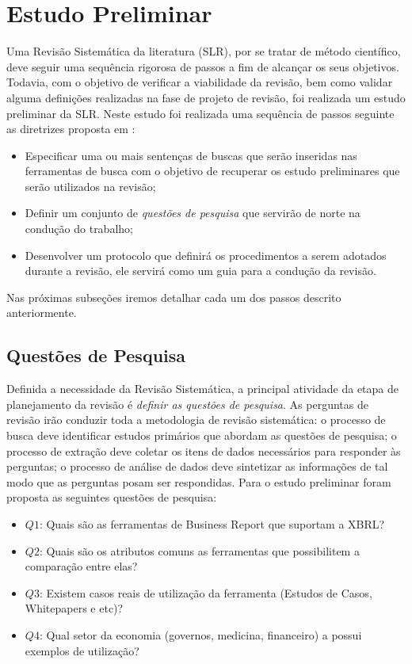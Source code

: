 \documentclass{article}
\begin{document}
\section{Estudo Preliminar}
\label{sec:rsl}

Uma Revisão Sistemática da literatura (SLR), por se tratar de método
científico, deve seguir uma sequência rigorosa de passos a fim de
alcançar os seus objetivos. Todavia, com o objetivo de verificar a
viabilidade da revisão, bem como validar alguma definições realizadas
na fase de projeto de revisão, foi realizada um estudo preliminar da
SLR. Neste estudo foi realizada uma sequência de passos seguinte as
diretrizes proposta em \cite{keele2007guidelines}: 
\begin{itemize}
  \item Especificar uma ou mais sentenças de buscas que serão
    inseridas nas ferramentas de busca com o objetivo de recuperar os
    estudo preliminares que serão utilizados na revisão;
  \item Definir um conjunto de \textit{questões de pesquisa} que
    servirão de norte na condução do trabalho;
 \item Desenvolver um protocolo que definirá os procedimentos a serem adotados durante a revisão, ele servirá como um guia para a condução da revisão. 
\end{itemize}

Nas próximas subseções iremos detalhar cada um dos passos descrito
anteriormente.
\subsection{Questões de Pesquisa}
\label{subsec:research_question}

Definida a necessidade da Revisão Sistemática, a principal atividade
da etapa de planejamento da revisão é \textit{definir as questões de
  pesquisa}. As perguntas de revisão irão conduzir toda a metodologia
de revisão sistemática: o processo de busca deve identificar estudos
primários que abordam as questões de pesquisa; o processo de extração
deve coletar os itens de dados necessários para responder às
perguntas; o processo de análise de dados deve sintetizar as
informações de tal modo que as perguntas posam ser respondidas. Para o
estudo preliminar foram proposta as seguintes questões de pesquisa:
\begin{itemize}
  \item \textbf{$Q1$}: Quais são as ferramentas de Business Report que
    suportam a XBRL?
  \item \textbf{$Q2$}: Quais são os atributos comuns as ferramentas
    que possibilitem a comparação entre elas?
  \item \textbf{$Q3$}: Existem casos reais de utilização da ferramenta
    (Estudos de Casos, Whitepapers e etc)?
  \item \textbf{$Q4$}: Qual setor da economia (governos, medicina, financeiro) a
    possui exemplos de utilização?
\end{itemize}
\end{document}
